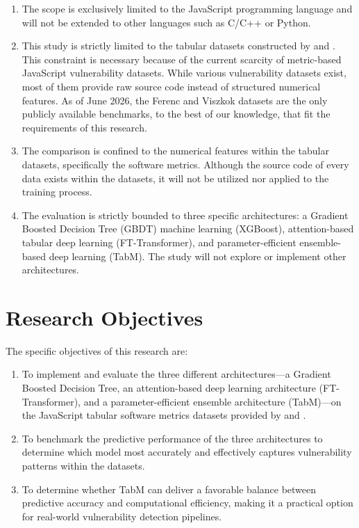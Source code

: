\begin{enumerate}
  \item The scope is exclusively limited to the JavaScript programming language and will not be extended to other languages such as C/C++ or Python.
  \item This study is strictly limited to the tabular datasets constructed by \citet{ferenc_challenging_2019} and \citet{viszkok_improving_2021}. This constraint is necessary because of the current scarcity of metric-based JavaScript vulnerability datasets. While various vulnerability datasets exist, most of them provide raw source code instead of structured numerical features. As of June 2026, the Ferenc and Viszkok datasets are the only publicly available benchmarks, to the best of our knowledge, that fit the requirements of this research.
  \item The comparison is confined to the numerical features within the tabular datasets, specifically the software metrics. Although the source code of every data exists within the datasets, it will not be utilized nor applied to the training process.
  \item The evaluation is strictly bounded to three specific architectures: a Gradient Boosted Decision Tree (GBDT) machine learning (XGBoost), attention-based tabular deep learning (FT-Transformer), and parameter-efficient ensemble-based deep learning (TabM). The study will not explore or implement other architectures.
\end{enumerate}

\section{Research Objectives}


The specific objectives of this research are:

\begin{enumerate}
  \item To implement and evaluate the three different architectures—a Gradient Boosted Decision Tree, an attention-based deep learning architecture (FT-Transformer), and a parameter-efficient ensemble architecture (TabM)—on the JavaScript tabular software metrics datasets provided by \citet{ferenc_challenging_2019} and \citet{viszkok_improving_2021}.
  \item To benchmark the predictive performance of the three architectures to determine which model most accurately and effectively captures vulnerability patterns within the datasets.
  \item To determine whether TabM can deliver a favorable balance between predictive accuracy and computational efficiency, making it a practical option for real-world vulnerability detection pipelines.
\end{enumerate}

